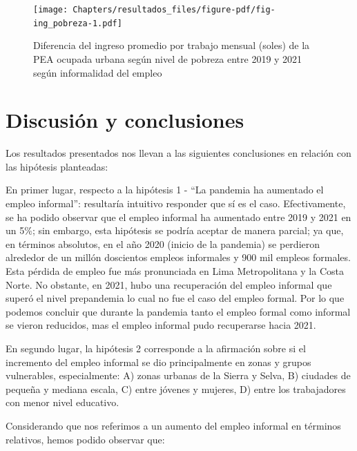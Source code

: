 \documentclass[
  letterpaper,
  12pt,
  oneside,
  spanish,
  doublespacing,
  headsepline,
  parskip]{MastersDoctoralThesis}
\begin{document}
\begin{figure}

\caption{\label{fig-ing_pobreza}Diferencia del ingreso promedio por
trabajo mensual (soles) de la PEA ocupada urbana según nivel de pobreza
entre 2019 y 2021 según informalidad del empleo}

{\centering \texttt{[image: Chapters/resultados\_files/figure-pdf/fig-ing\_pobreza-1.pdf]}

}

\end{figure}

\break


\hypertarget{discusiuxf3n-y-conclusiones}{%
\chapter{Discusión y conclusiones}\label{discusiuxf3n-y-conclusiones}}

Los resultados presentados nos llevan a las siguientes conclusiones en
relación con las hipótesis planteadas:

En primer lugar, respecto a la hipótesis 1 - ``La pandemia ha aumentado
el empleo informal'': resultaría intuitivo responder que sí es el caso.
Efectivamente, se ha podido observar que el empleo informal ha aumentado
entre 2019 y 2021 en un 5\%; sin embargo, esta hipótesis se podría
aceptar de manera parcial; ya que, en términos absolutos, en el año 2020
(inicio de la pandemia) se perdieron alrededor de un millón doscientos
empleos informales y 900 mil empleos formales. Esta pérdida de empleo
fue más pronunciada en Lima Metropolitana y la Costa Norte. No obstante,
en 2021, hubo una recuperación del empleo informal que superó el nivel
prepandemia lo cual no fue el caso del empleo formal. Por lo que podemos
concluir que durante la pandemia tanto el empleo formal como informal se
vieron reducidos, mas el empleo informal pudo recuperarse hacia 2021.

En segundo lugar, la hipótesis 2 corresponde a la afirmación sobre si el
incremento del empleo informal se dio principalmente en zonas y grupos
vulnerables, especialmente: A) zonas urbanas de la Sierra y Selva, B)
ciudades de pequeña y mediana escala, C) entre jóvenes y mujeres, D)
entre los trabajadores con menor nivel educativo.

Considerando que nos referimos a un aumento del empleo informal en
términos relativos, hemos podido observar que:
\end{document}

